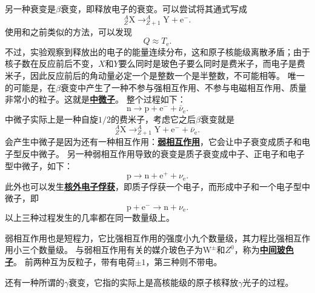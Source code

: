 \documentclass[UTF8, a4paper]{ctexart}
\newcommand*{\nuclear}[3]{^{#2}_{#3}\text{#1}}
\newcommand*{\concept}[1]{\underline{\textbf{#1}}}
\begin{document}
另一种衰变是$\beta$衰变，即释放电子的衰变。可以尝试将其通式写成
\[
    \nuclear{X}{A}{Z} \longrightarrow \nuclear{Y}{A}{Z+1} + \text{e}^-.
\]
使用和之前类似的方法，可以发现
\begin{equation}
    Q \approx T_\text{e}.
\end{equation}
不过，实验观察到释放出的电子的能量连续分布，这和原子核能级离散矛盾；由于核子数在反应前后不变，$X$和$Y$要么同时是玻色子要么同时是费米子，而电子是费米子，因此反应前后的角动量必定一个是整数一个是半整数，不可能相等。
唯一的可能是，在$\beta$衰变中产生了一种不参与强相互作用、不参与电磁相互作用、质量非常小的粒子。这就是\concept{中微子}。
整个过程如下：
\[
    \text{n} \longrightarrow \text{p} + \text{e}^- + \bar{\nu}_\text{e}.
\]
中微子实际上是一种自旋$1/2$的费米子，考虑它之后$\beta$衰变就是
\[
    \nuclear{X}{A}{Z} \longrightarrow \nuclear{Y}{A}{Z+1} + \text{e}^- + \bar{\nu}_\text{e}.
\]
会产生中微子是因为还有一种相互作用：\concept{弱相互作用}，它会让中子衰变成质子和电子型反中微子。
另一种弱相互作用导致的衰变是质子衰变成中子、正电子和电子型中微子，如下：
\[
    \text{p} \longrightarrow \text{n} + \text{e}^+ + \nu_\text{e}.
\]
此外也可以发生\concept{核外电子俘获}，即质子俘获一个电子，而形成中子和一个电子型中微子，即
\[
    \text{p} + \text{e}^- \longrightarrow \text{n} + \nu_\text{e}.
\]
以上三种过程发生的几率都在同一数量级上。

弱相互作用也是短程力，它比强相互作用的强度小九个数量级，其力程比强相互作用小三个数量级。
与弱相互作用有关的媒介玻色子为$\text{W}^\pm$和$Z^0$，称为\concept{中间玻色子}。
前两种互为反粒子，带有电荷$\pm 1$，第三种则不带电。

还有一种所谓的$\gamma$衰变，它指的实际上是高核能级的原子核释放$\gamma$光子的过程。
\end{document}

